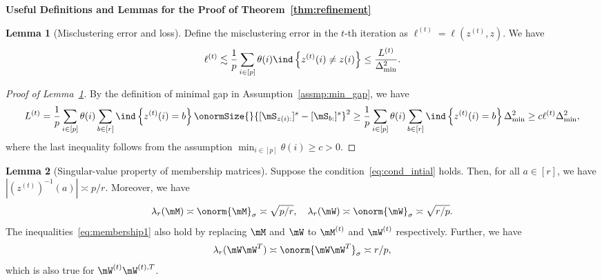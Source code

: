 \documentclass[lettersize,onecolumn,journal]{IEEEtran}
\theoremstyle{definition}
\newtheorem{lem}{Lemma}
\theoremstyle{definition}
\newcommand{\of}[1]{\left(#1\right)}
\newcommand{\offf}[1]{\left\{#1\right\}}
\begin{document}
{\bf Useful Definitions and Lemmas for the Proof of Theorem~\ref{thm:refinement}} 


\begin{lem}[Misclustering error and loss]\label{lem:mis} Define the misclustering error in the $t$-th iteration as $\ell^{(t)} = \ell(z^{(t)}, z)$. We have 
\begin{equation}
    \ell^{(t)} \lesssim \frac{1}{p}\sum_{i \in [p]} \theta(i) \ind\offf{ z^{(t)}(i) \neq z(i) } \leq \frac{L^{(t)}}{\Delta_{\min}^2}.
\end{equation}
\end{lem}

\begin{proof}[Proof of Lemma~\ref{lem:mis}]
By the definition of minimal gap in Assumption~\ref{assmp:min_gap}, we have 
\begin{equation}
         L^{(t)} = \frac{1}{p}  \sum_{i \in [p]} \theta(i) \sum_{b \in [r]}  \ind \offf{ z^{(t)}(i) = b } \onormSize{}{ [ \mS_{ z(i):}  ]^s - [ \mS_{b:}  ]^s  }^2 \geq \frac{1}{p}  \sum_{i \in [p]} \theta(i) \sum_{b \in [r]}  \ind \offf{ z^{(t)}(i) = b } \Delta_{\min}^2 \geq c \ell^{(t)} \Delta_{\min}^2,
    \end{equation}
    where the last inequality follows from the assumption $\min_{i \in [p]} \theta(i) \geq c>0$.
\end{proof}

\begin{lem}[Singular-value property of membership matrices]\label{lem:membership} Suppose the condition~\eqref{eq:cond_intial} holds. Then, for all $a \in [r]$, we have $|\of{z^{(t)}}^{-1}(a)| \asymp p/r$. Moreover, we have 
\begin{equation}\label{eq:membership1}
    \lambda_{r}(\mM) \asymp \onorm{\mM}_{\sigma} \asymp \sqrt{p/r}, \quad  \lambda_{r}(\mW) \asymp \onorm{\mW}_{\sigma} \asymp \sqrt{r/p}.
\end{equation}
The inequalities~\eqref{eq:membership1} also hold by replacing $\mM$ and $\mW$ to $\mM^{(t)}$ and $\mW^{(t)}$ respectively. 
Further, we have 
\begin{equation}\label{eq:WWsingular}
   \lambda_{r}(\mW\mW^T) \asymp \onorm{\mW\mW^T}_{\sigma} \asymp r/p,
\end{equation}
which is also true for $\mW^{(t)}\mW^{(t),T}$.
\end{lem}
\end{document}
